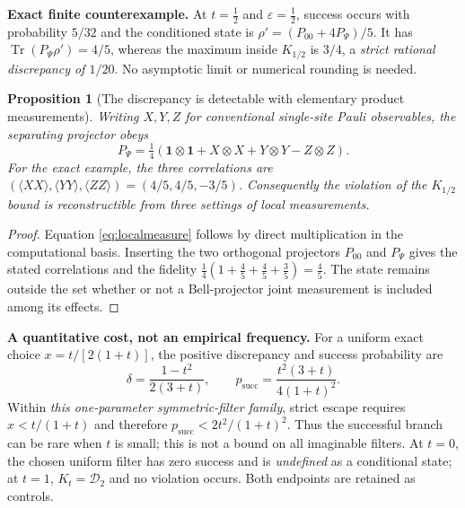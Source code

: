 \documentclass[10pt,letterpaper]{article}
\newtheorem{proposition}[theorem]{Proposition}
\newcommand{\D}{\mathcal D}
\newcommand{\Tr}{\operatorname{Tr}}
\newcommand{\I}{\mathbf 1}
\begin{document}
\textbf{Exact finite counterexample.} At $t=\tfrac12$ and $\varepsilon=\tfrac12$, success occurs with probability $5/32$ and the conditioned state is $\rho'=(P_{00}+4P_\Psi)/5$. It has $\Tr(P_\Psi\rho')=4/5$, whereas the maximum inside $K_{1/2}$ is $3/4$, a \emph{strict rational discrepancy of $1/20$}. No asymptotic limit or numerical rounding is needed.

\begin{proposition}[The discrepancy is detectable with elementary product measurements]
Writing $X,Y,Z$ for conventional single-site Pauli observables, the separating projector obeys
\begin{equation}\label{eq:localmeasure}
P_\Psi=\tfrac14(\I\otimes\I+X\otimes X+Y\otimes Y-Z\otimes Z).
\end{equation}
For the exact example, the three correlations are $(\langle XX\rangle,\langle YY\rangle,\langle ZZ\rangle)=(4/5,4/5,-3/5)$. Consequently the violation of the $K_{1/2}$ bound is reconstructible from three settings of \emph{local} measurements.
\end{proposition}
\begin{proof} Equation \eqref{eq:localmeasure} follows by direct multiplication in the computational basis. Inserting the two orthogonal projectors $P_{00}$ and $P_\Psi$ gives the stated correlations and the fidelity $\tfrac14(1+\tfrac45+\tfrac45+\tfrac35)=\tfrac45$. The state remains outside the set whether or not a Bell-projector joint measurement is included among its effects.\end{proof}

\textbf{A quantitative cost, not an empirical frequency.} For a uniform exact choice $x=t/[2(1+t)]$, the positive discrepancy and success probability are
\begin{equation}\label{eq:uniform}
\delta=\frac{1-t^2}{2(3+t)},\qquad p_{\mathrm{succ}}=\frac{t^2(3+t)}{4(1+t)^2}.
\end{equation}
Within \emph{this one-parameter symmetric-filter family}, strict escape requires $x<t/(1+t)$ and therefore $p_{\mathrm{succ}}<2t^2/(1+t)^2$. Thus the successful branch can be rare when $t$ is small; this is not a bound on all imaginable filters. At $t=0$, the chosen uniform filter has zero success and is \emph{undefined} as a conditional state; at $t=1$, $K_t=\D_2$ and no violation occurs. Both endpoints are retained as controls.
\end{document}
